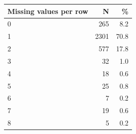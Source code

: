 \begin{threeparttable}


\begin{tabular}{@{}lrr@{}}


\toprule


\textbf{Missing values per row} & \textbf{N} & \textbf{\%} \\


\midrule


\midrule
0           &         265&         8.2\\
1           &        2301&        70.8\\
2           &         577&        17.8\\
3           &          32&         1.0\\
4           &          18&         0.6\\
5           &          25&         0.8\\
6           &           7&         0.2\\
7           &          19&         0.6\\
8           &           5&         0.2\\
\bottomrule


\end{tabular}


\end{threeparttable}
